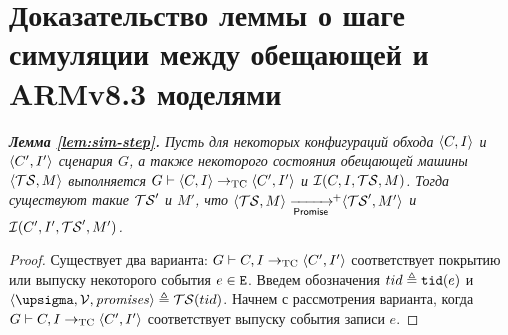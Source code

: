 \chapter{Доказательство леммы о шаге симуляции между обещающей и ARMv8.3 моделями}
\label{sec:sim-step-proof}

  \emph{{\bf Лемма \ref{lem:sim-step}.}
  Пусть для некоторых конфигураций обхода ${\langle{C, I}\rangle}$ и ${\langle{C', I'}\rangle}$ сценария $G$,
  а также некоторого состояния обещающей машины ${\langle{\ensuremath{\mathcal{TS}}, M}\rangle}$ выполняется
  $G \vdash {\langle{C, I}\rangle} \rightarrow_{\rm TC} {\langle{C', I'}\rangle}$ и
  $\mathcal{I}(C, I, \mathcal{TS}, M)$.
  Тогда существуют такие $\mathcal{TS}'$ и $M'$, что $\tup{\TSf, M} \stepp\!\!^{+} \tup{\TSf', M'}$ и
  $\mathcal{I}(C', I', \mathcal{TS}', M')$.}
\begin{proof}%
  Существует два варианта: $G \vdash C, I \rightarrow_{\rm TC} {\langle{C', I'}\rangle}$ соответствует покрытию или
  выпуску некоторого события $e \in {\mathtt{E}}$. Введем обозначения $tid \triangleq {\mathtt{tid}}(e)$ и
  $\tup{\pstate, \View, \PromSet} \defeq \TSf(tid)$.
  Начнем с рассмотрения варианта, когда $G \vdash C, I \rightarrow_{\rm TC} {\langle{C', I'}\rangle}$ соответствует
  выпуску события записи $e$.


\end{proof}
